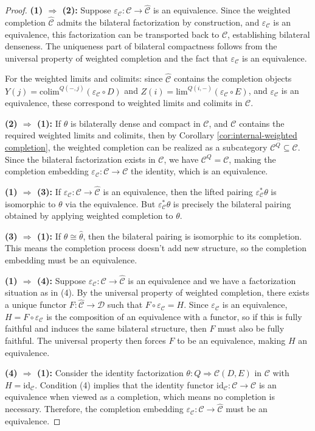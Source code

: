 \documentclass[11pt]{article}
\theoremstyle{plain}
\theoremstyle{definition}
\theoremstyle{remark}
\newcommand{\C}{\mathcal{C}}
\newcommand{\D}{\mathcal{D}}
\newcommand{\id}{\mathrm{id}}
\newcommand{\colim}{\mathrm{colim}}
\renewcommand{\lim}{\mathrm{lim}}
\newcommand{\wh}[1]{\widehat{#1}}
\begin{document}
\begin{proof}
\textbf{(1) $\Rightarrow$ (2):} 
Suppose $\varepsilon_\C : \C \to \wh{\C}$ is an equivalence. Since the weighted completion $\wh{\C}$ admits the bilateral factorization by construction, and $\varepsilon_\C$ is an equivalence, this factorization can be transported back to $\C$, establishing bilateral denseness. The uniqueness part of bilateral compactness follows from the universal property of weighted completion and the fact that $\varepsilon_\C$ is an equivalence.

For the weighted limits and colimits: since $\wh{\C}$ contains the completion objects $Y(j) = \colim^{Q(-, j)} (\varepsilon_\C \circ D)$ and $Z(i) = \lim^{Q(i, -)} (\varepsilon_\C \circ E)$, and $\varepsilon_\C$ is an equivalence, these correspond to weighted limits and colimits in $\C$.

\textbf{(2) $\Rightarrow$ (1):}
If $\theta$ is bilaterally dense and compact in $\C$, and $\C$ contains the required weighted limits and colimits, then by Corollary \ref{cor:internal-weighted completion}, the weighted completion can be realized as a subcategory $\C^Q \subseteq \C$. Since the bilateral factorization exists in $\C$, we have $\C^Q = \C$, making the completion embedding $\varepsilon_\C : \C \to \C$ the identity, which is an equivalence.

\textbf{(1) $\Rightarrow$ (3):}
If $\varepsilon_\C : \C \to \wh{\C}$ is an equivalence, then the lifted pairing $\varepsilon_\C^* \theta$ is isomorphic to $\theta$ via the equivalence. But $\varepsilon_\C^* \theta$ is precisely the bilateral pairing obtained by applying weighted completion to $\theta$.

\textbf{(3) $\Rightarrow$ (1):}
If $\theta \cong \wh{\theta}$, then the bilateral pairing is isomorphic to its completion. This means the completion process doesn't add new structure, so the completion embedding must be an equivalence.

\textbf{(1) $\Rightarrow$ (4):}
Suppose $\varepsilon_\C : \C \to \wh{\C}$ is an equivalence and we have a factorization situation as in (4). By the universal property of weighted completion, there exists a unique functor $F : \wh{\C} \to \D$ such that $F \circ \varepsilon_\C = H$. Since $\varepsilon_\C$ is an equivalence, $H = F \circ \varepsilon_\C$ is the composition of an equivalence with a functor, so if this is fully faithful and induces the same bilateral structure, then $F$ must also be fully faithful. The universal property then forces $F$ to be an equivalence, making $H$ an equivalence.

\textbf{(4) $\Rightarrow$ (1):}
Consider the identity factorization $\theta : Q \Rightarrow \C(D, E)$ in $\C$ with $H = \id_\C$. Condition (4) implies that the identity functor $\id_\C : \C \to \C$ is an equivalence when viewed as a completion, which means no completion is necessary. Therefore, the completion embedding $\varepsilon_\C : \C \to \wh{\C}$ must be an equivalence.
\end{proof}
\end{document}
